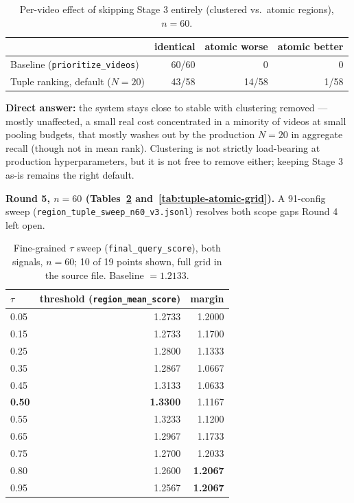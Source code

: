 \documentclass[11pt]{article}
\newcommand{\code}[1]{\texttt{\small #1}}
\newcommand{\file}[1]{\texttt{\footnotesize #1}}
\begin{document}
\begin{table}[h]
\centering\small
\begin{tabular}{@{}lrrr@{}}
\toprule
& identical & atomic worse & atomic better \\
\midrule
Baseline (\code{prioritize\_videos}) & 60/60 & 0 & 0 \\
Tuple ranking, default ($N{=}20$) & 43/58 & 14/58 & 1/58 \\
\bottomrule
\end{tabular}
\caption{Per-video effect of skipping Stage 3 entirely (clustered vs.\ atomic regions), $n=60$.}
\label{tab:tuple-clustering}
\end{table}

\noindent \textbf{Direct answer:} the system stays close to stable with clustering removed ---
mostly unaffected, a small real cost concentrated in a minority of videos at small pooling budgets,
that mostly washes out by the production $N{=}20$ in aggregate recall (though not in mean rank).
Clustering is not strictly load-bearing at production hyperparameters, but it is not free to remove
either; keeping Stage 3 as-is remains the right default.

\textbf{Round 5, $n=60$ (Tables~\ref{tab:tuple-tau} and~\ref{tab:tuple-atomic-grid}).} A 91-config
sweep (\file{region\_tuple\_sweep\_n60\_v3.jsonl}) resolves both scope gaps Round 4 left open.

\begin{table}[h]
\centering\small
\begin{tabular}{@{}lrr@{}}
\toprule
$\tau$ & threshold (\code{region\_mean\_score}) & margin \\
\midrule
0.05 & 1.2733 & 1.2000 \\
0.15 & 1.2733 & 1.1700 \\
0.25 & 1.2800 & 1.1333 \\
0.35 & 1.2867 & 1.0667 \\
0.45 & 1.3133 & 1.0633 \\
\textbf{0.50} & \textbf{1.3300} & 1.1167 \\
0.55 & 1.3233 & 1.1200 \\
0.65 & 1.2967 & 1.1733 \\
0.75 & 1.2700 & 1.2033 \\
0.80 & 1.2600 & \textbf{1.2067} \\
0.95 & 1.2567 & \textbf{1.2067} \\
\bottomrule
\end{tabular}
\caption{Fine-grained $\tau$ sweep (\code{final\_query\_score}), both signals, $n=60$; 10 of 19
points shown, full grid in the source file. Baseline $=1.2133$.}
\label{tab:tuple-tau}
\end{table}
\end{document}
